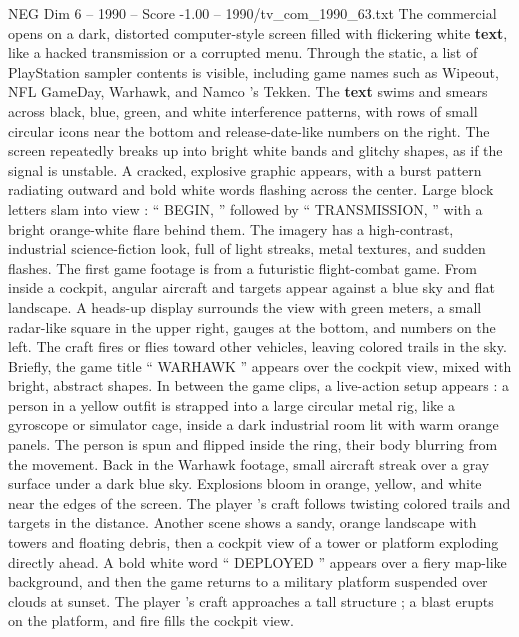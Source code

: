 \begin{textsample}{NEG Dim 6 – 1990 – Score -1.00 – 1990/tv\_com\_1990\_63.txt}  \label{ex:f6_neg_024}
The commercial opens on a dark, distorted computer-style screen filled with flickering white \textbf{text}, like a hacked transmission or a corrupted menu.
Through the static, a list of PlayStation sampler contents is visible, including game names such as Wipeout, NFL GameDay, Warhawk, and Namco ’s Tekken.
The \textbf{text} swims and smears across black, blue, green, and white interference patterns, with rows of small circular icons near the bottom and release-date-like numbers on the right.
The screen repeatedly breaks up into bright white bands and glitchy shapes, as if the signal is unstable.
A cracked, explosive graphic appears, with a burst pattern radiating outward and bold white words flashing across the center.
Large block letters slam into view : “ BEGIN, ” followed by “ TRANSMISSION, ” with a bright orange-white flare behind them.
The imagery has a high-contrast, industrial science-fiction look, full of light streaks, metal textures, and sudden flashes.
The first game footage is from a futuristic flight-combat game.
From inside a cockpit, angular aircraft and targets appear against a blue sky and flat landscape.
A heads-up display surrounds the view with green meters, a small radar-like square in the upper right, gauges at the bottom, and numbers on the left.
The craft fires or flies toward other vehicles, leaving colored trails in the sky.
Briefly, the game title “ WARHAWK ” appears over the cockpit view, mixed with bright, abstract shapes.
In between the game clips, a live-action setup appears : a person in a yellow outfit is strapped into a large circular metal rig, like a gyroscope or simulator cage, inside a dark industrial room lit with warm orange panels.
The person is spun and flipped inside the ring, their body blurring from the movement.
Back in the Warhawk footage, small aircraft streak over a gray surface under a dark blue sky.
Explosions bloom in orange, yellow, and white near the edges of the screen.
The player ’s craft follows twisting colored trails and targets in the distance.
Another scene shows a sandy, orange landscape with towers and floating debris, then a cockpit view of a tower or platform exploding directly ahead.
A bold white word “ DEPLOYED ” appears over a fiery map-like background, and then the game returns to a military platform suspended over clouds at sunset.
The player ’s craft approaches a tall structure ; a blast erupts on the platform, and fire fills the cockpit view.

\end{textsample}
